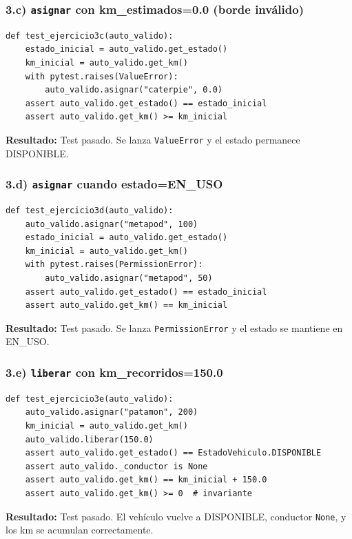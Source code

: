 \subsubsection*{3.c) \texttt{asignar} con km\_estimados=0.0 (borde inválido)}

\begin{verbatim}
def test_ejercicio3c(auto_valido):
    estado_inicial = auto_valido.get_estado()
    km_inicial = auto_valido.get_km()
    with pytest.raises(ValueError):
        auto_valido.asignar("caterpie", 0.0)
    assert auto_valido.get_estado() == estado_inicial
    assert auto_valido.get_km() >= km_inicial
\end{verbatim}

\textbf{Resultado:} Test pasado. Se lanza \texttt{ValueError} y el estado permanece DISPONIBLE.



\subsubsection*{3.d) \texttt{asignar} cuando estado=EN\_USO}

\begin{verbatim}
def test_ejercicio3d(auto_valido):
    auto_valido.asignar("metapod", 100)
    estado_inicial = auto_valido.get_estado()
    km_inicial = auto_valido.get_km()
    with pytest.raises(PermissionError):
        auto_valido.asignar("metapod", 50)
    assert auto_valido.get_estado() == estado_inicial
    assert auto_valido.get_km() == km_inicial
\end{verbatim}

\textbf{Resultado:} Test pasado. Se lanza \texttt{PermissionError} y el estado se mantiene en EN\_USO.

\subsubsection*{3.e) \texttt{liberar} con km\_recorridos=150.0}

\begin{verbatim}
def test_ejercicio3e(auto_valido):
    auto_valido.asignar("patamon", 200)
    km_inicial = auto_valido.get_km()
    auto_valido.liberar(150.0)
    assert auto_valido.get_estado() == EstadoVehiculo.DISPONIBLE
    assert auto_valido._conductor is None
    assert auto_valido.get_km() == km_inicial + 150.0
    assert auto_valido.get_km() >= 0  # invariante
\end{verbatim}

\textbf{Resultado:} Test pasado. El vehículo vuelve a DISPONIBLE, conductor \texttt{None}, y los km se acumulan correctamente.

